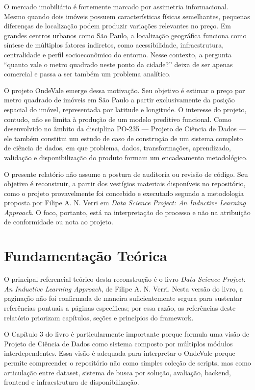 \documentclass[12pt]{report}
\begin{document}
O mercado imobiliário é fortemente marcado por assimetria informacional. Mesmo quando dois imóveis possuem características físicas semelhantes, pequenas diferenças de localização podem produzir variações relevantes no preço. Em grandes centros urbanos como São Paulo, a localização geográfica funciona como síntese de múltiplos fatores indiretos, como acessibilidade, infraestrutura, centralidade e perfil socioeconômico do entorno. Nesse contexto, a pergunta ``quanto vale o metro quadrado neste ponto da cidade?'' deixa de ser apenas comercial e passa a ser também um problema analítico.

O projeto OndeVale emerge dessa motivação. Seu objetivo é estimar o preço por metro quadrado de imóveis em São Paulo a partir exclusivamente da posição espacial do imóvel, representada por latitude e longitude. O interesse do projeto, contudo, não se limita à produção de um modelo preditivo funcional. Como desenvolvido no âmbito da disciplina PO-235 --- Projeto de Ciência de Dados --- ele também constitui um estudo de caso de construção de um sistema completo de ciência de dados, em que problema, dados, transformações, aprendizado, validação e disponibilização do produto formam um encadeamento metodológico.

O presente relatório não assume a postura de auditoria ou revisão de código. Seu objetivo é reconstruir, a partir dos vestígios materiais disponíveis no repositório, como o projeto provavelmente foi concebido e executado segundo a metodologia proposta por Filipe A. N. Verri em \textit{Data Science Project: An Inductive Learning Approach}. O foco, portanto, está na interpretação do processo e não na atribuição de conformidade ou nota ao projeto.

\chapter{Fundamentação Teórica}

O principal referencial teórico desta reconstrução é o livro \textit{Data Science Project: An Inductive Learning Approach}, de Filipe A. N. Verri. Nesta versão do livro, a paginação não foi confirmada de maneira suficientemente segura para sustentar referências pontuais a páginas específicas; por essa razão, as referências deste relatório priorizam capítulos, seções e princípios do framework.

O Capítulo 3 do livro é particularmente importante porque formula uma visão de Projeto de Ciência de Dados como sistema composto por múltiplos módulos interdependentes. Essa visão é adequada para interpretar o OndeVale porque permite compreender o repositório não como simples coleção de scripts, mas como articulação entre dataset, sistema de busca por solução, avaliação, backend, frontend e infraestrutura de disponibilização.
\end{document}
